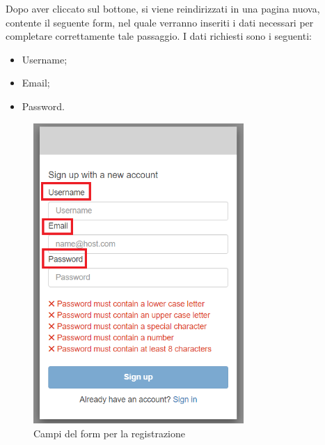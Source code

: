 {Dopo aver cliccato sul bottone, si viene reindirizzati in una pagina nuova, contente il seguente form, nel quale verranno inseriti i dati necessari per completare 
correttamente tale passaggio. \aCapo
I dati richiesti sono i seguenti:
\begin{itemize}
    \item Username;
    \item Email;
    \item Password.
\end{itemize}
\begin{figure}[H]
    \includegraphics[width=8cm]{sezioni/images/form-reg.png}
    \centering
    \caption{Campi del form per la registrazione}
\end{figure} 

}
